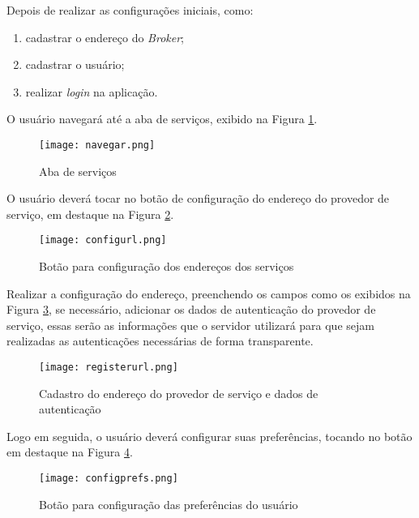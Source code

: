 Depois de realizar as configurações iniciais, como:
\begin{enumerate}
  \item cadastrar o endereço do \textit{Broker};
  \item cadastrar o usuário;
  \item realizar \textit{login} na aplicação.
\end{enumerate}

O usuário navegará até a aba de serviços, exibido na Figura \ref{fig:navegar}.

\begin{figure}[!htb]
  \centering
  \texttt{[image: navegar.png]} %
  \caption[Aba de serviços]{Aba de serviços}
  \label{fig:navegar}
\end{figure}

O usuário deverá tocar no botão de configuração do endereço do provedor de serviço, em destaque na Figura \ref{fig:configurl}.

\begin{figure}[!htb]
  \centering
  \texttt{[image: configurl.png]} %
  \caption[Botão para configuração dos endereços dos serviços]{Botão para configuração dos endereços dos serviços}
  \label{fig:configurl}
\end{figure}

Realizar a configuração do endereço, preenchendo os campos como os exibidos na Figura \ref{fig:registerurl}, se necessário, adicionar os dados de autenticação do provedor de serviço, essas serão as informações que o servidor utilizará para que sejam realizadas as autenticações necessárias de forma transparente.

\begin{figure}[!htb]
  \centering
  \texttt{[image: registerurl.png]} %
  \caption[Cadastro do endereço do provedor de serviço e dados de autenticação]{Cadastro do endereço do provedor de serviço e dados de autenticação}
  \label{fig:registerurl}
\end{figure}

Logo em seguida, o usuário deverá configurar suas preferências, tocando no botão em destaque na Figura \ref{fig:configprefs}.

\begin{figure}[!htb]
  \centering
  \texttt{[image: configprefs.png]} %
  \caption[Botão para configuração das preferências do usuário]{Botão para configuração das preferências do usuário}
  \label{fig:configprefs}
\end{figure}

